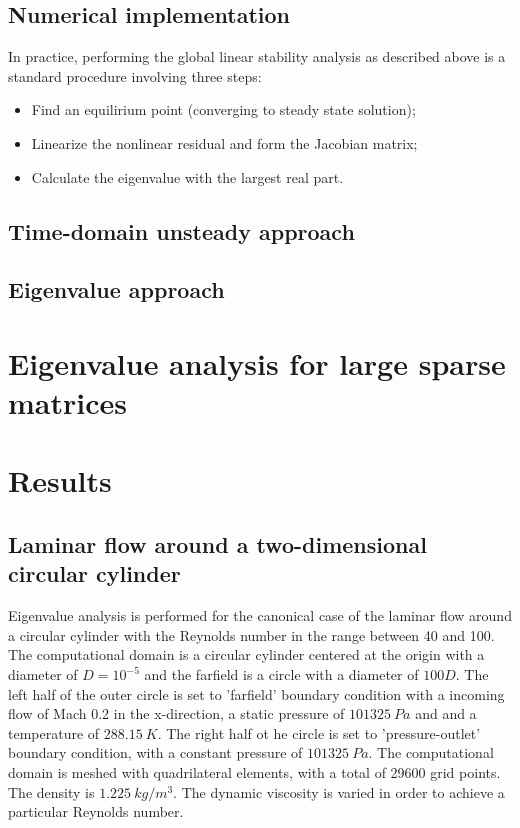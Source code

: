 \documentclass[journal,final]{new-aiaa}
\begin{document}
\subsection{Numerical implementation}
In practice, performing the global linear stability analysis as described above
is a standard procedure involving three steps:
\begin{itemize}
	\item Find an equilirium point (converging to steady state solution);
	\item Linearize the nonlinear residual and form the Jacobian matrix;
	\item Calculate the eigenvalue with the largest real part.
\end{itemize}

\subsection{Time-domain unsteady approach}
\subsection{Eigenvalue approach}
\section{Eigenvalue analysis for large sparse matrices}

\section{Results}
\label{results}

\subsection{Laminar flow around a two-dimensional circular cylinder}
Eigenvalue analysis is performed for the canonical case of the
laminar flow around a circular cylinder with the Reynolds number in
the range between 40 and 100. The computational domain is a
circular cylinder centered at the origin with a diameter of $D=10^{-5}$
and the farfield is a circle with a diameter of $100D$. The left half of
the outer circle is set to 'farfield' boundary condition with a incoming
flow of Mach 0.2 in the x-direction, a static pressure of $101325~Pa$ and
and a temperature of $288.15~K$.
The right half ot he circle is set to 'pressure-outlet' boundary condition,
with a constant pressure of $101325~Pa$.
The computational domain is meshed with quadrilateral elements,
with a total of 29600 grid points. The density is $1.225~kg/m^3$.
The dynamic viscosity is varied in order to achieve a particular Reynolds number.
\end{document}
